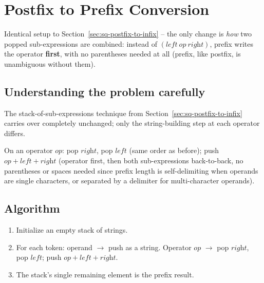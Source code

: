 \section{Postfix to Prefix Conversion}
\label{sec:sq-postfix-to-prefix}


\begin{patternbox}
Identical setup to Section~\ref{sec:sq-postfix-to-infix} -- the only
change is \emph{how} two popped sub-expressions are combined: instead of
$(\textit{left}\ \textit{op}\ \textit{right})$, prefix writes the operator
\textbf{first}, with no parentheses needed at all (prefix, like postfix,
is unambiguous without them).
\end{patternbox}

\subsection*{Understanding the problem carefully}

The stack-of-sub-expressions technique from
Section~\ref{sec:sq-postfix-to-infix} carries over completely unchanged;
only the string-building step at each operator differs.

\begin{ideabox}
On an operator $\textit{op}$: pop $\textit{right}$, pop $\textit{left}$
(same order as before); push $\textit{op} + \textit{left} +
\textit{right}$ (operator first, then both sub-expressions
back-to-back, no parentheses or spaces needed since prefix length is
self-delimiting when operands are single characters, or separated by a
delimiter for multi-character operands).
\end{ideabox}

\subsection*{Algorithm}

\begin{enumerate}
  \item Initialize an empty stack of strings.
  \item For each token: operand $\to$ push as a string. Operator
        $\textit{op}$ $\to$ pop $\textit{right}$, pop $\textit{left}$;
        push $\textit{op} + \textit{left} + \textit{right}$.
  \item The stack's single remaining element is the prefix result.
\end{enumerate}

